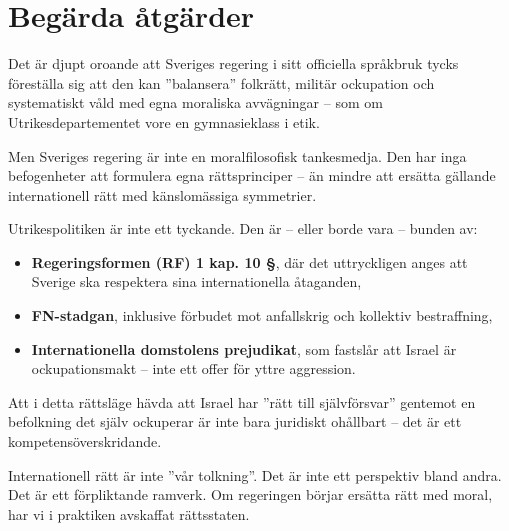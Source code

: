 





\section{Begärda åtgärder}


Det är djupt oroande att Sveriges regering i sitt officiella språkbruk tycks föreställa sig att den kan ”balansera” folkrätt, militär ockupation och systematiskt våld med egna moraliska avvägningar – som om Utrikesdepartementet vore en gymnasieklass i etik.

Men Sveriges regering är inte en moralfilosofisk tankesmedja. Den har inga befogenheter att formulera egna rättsprinciper – än mindre att ersätta gällande internationell rätt med känslomässiga symmetrier.

Utrikespolitiken är inte ett tyckande. Den är – eller borde vara – bunden av:

\begin{itemize}
  \item \textbf{Regeringsformen (RF) 1 kap. 10 §}, där det uttryckligen anges att Sverige ska respektera sina internationella åtaganden,
  \item \textbf{FN-stadgan}, inklusive förbudet mot anfallskrig och kollektiv bestraffning,
  \item \textbf{Internationella domstolens prejudikat}, som fastslår att Israel är ockupationsmakt – inte ett offer för yttre aggression.
\end{itemize}

Att i detta rättsläge hävda att Israel har ”rätt till självförsvar” gentemot en befolkning det själv ockuperar är inte bara juridiskt ohållbart – det är ett kompetensöverskridande.

Internationell rätt är inte ”vår tolkning”. Det är inte ett perspektiv bland andra. Det är ett förpliktande ramverk. Om regeringen börjar ersätta rätt med moral, har vi i praktiken avskaffat rättsstaten.

